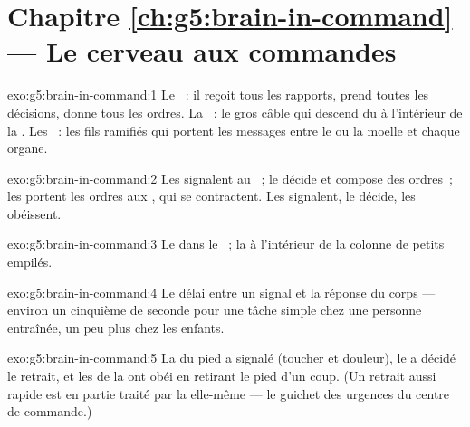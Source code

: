 \section*{Chapitre \ref{ch:g5:brain-in-command} --- Le cerveau aux commandes}

\begin{solution}{exo:g5:brain-in-command:1}
Le ~: il reçoit tous les rapports, prend toutes les décisions,
donne tous les ordres. La ~: le gros câble qui descend
du  à l'intérieur de la . Les ~: les
fils ramifiés qui portent les messages entre le  ou la moelle
et chaque organe.
\end{solution}

\begin{solution}{exo:g5:brain-in-command:2}
Les  signalent au ~; le  décide et
compose des ordres~; les  portent les ordres aux , qui
se contractent. Les  signalent, le  décide,
les  obéissent.
\end{solution}

\begin{solution}{exo:g5:brain-in-command:3}
Le  dans le ~; la  à l'intérieur de la
colonne de petits  empilés.
\end{solution}

\begin{solution}{exo:g5:brain-in-command:4}
Le délai entre un signal et la réponse du corps --- environ un
cinquième de seconde pour une tâche simple chez une personne
entraînée, un peu plus chez les enfants.
\end{solution}

\begin{solution}{exo:g5:brain-in-command:5}
La  du pied a signalé (toucher et douleur), le  a
décidé le retrait, et les  de la  ont obéi en retirant
le pied d'un coup. (Un retrait aussi rapide est en partie traité par
la  elle-même --- le guichet des urgences du centre
de commande.)
\end{solution}

